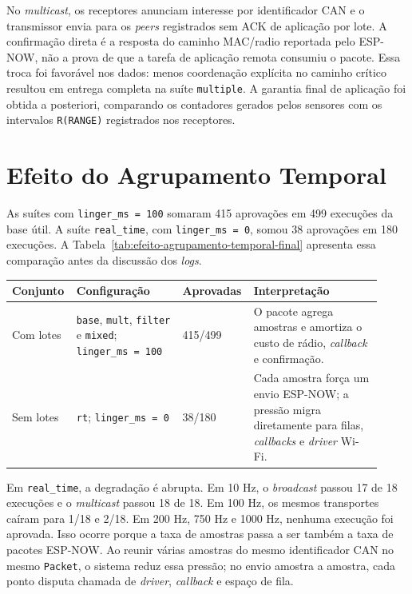 No \emph{multicast}, os receptores anunciam interesse por identificador CAN e o transmissor envia
para os \emph{peers} registrados sem ACK de aplicação por lote. A confirmação direta é
a resposta do caminho MAC/radio reportada pelo ESP-NOW, não a prova de que a
tarefa de aplicação remota consumiu o pacote. Essa troca foi favorável nos dados:
menos coordenação explícita no caminho crítico resultou em entrega completa na
suíte \texttt{multiple}. A garantia final de aplicação foi obtida a posteriori,
comparando os contadores gerados pelos sensores com os intervalos \texttt{R(RANGE)}
registrados nos receptores.

\section{Efeito do Agrupamento Temporal}

As suítes com \texttt{linger\_ms = 100} somaram 415 aprovações em 499 execuções
da base útil. A suíte \texttt{real\_time}, com \texttt{linger\_ms = 0}, somou
38 aprovações em 180 execuções. A Tabela~\ref{tab:efeito-agrupamento-temporal-final}
apresenta essa comparação antes da discussão dos \emph{logs}.

\begin{center}
\small
\setlength{\tabcolsep}{5pt}
\renewcommand{\arraystretch}{1.12}
\begin{tabular}{p{0.16\linewidth}|p{0.28\linewidth}|p{0.14\linewidth}|p{0.34\linewidth}}
\hline
Conjunto & Configuração & Aprovadas & Interpretação \\
\hline
Com lotes & \texttt{base}, \texttt{mult}, \texttt{filter} e \texttt{mixed}; \texttt{linger\_ms = 100} & 415/499 & O pacote agrega amostras e amortiza o custo de rádio, \emph{callback} e confirmação. \\
\hline
Sem lotes & \texttt{rt}; \texttt{linger\_ms = 0} & 38/180 & Cada amostra força um envio ESP-NOW; a pressão migra diretamente para filas, \emph{callbacks} e \emph{driver} Wi-Fi. \\
\hline
\end{tabular}
\label{tab:efeito-agrupamento-temporal-final}
\end{center}

Em \texttt{real\_time}, a degradação é abrupta. Em 10 Hz, o \emph{broadcast} passou 17
de 18 execuções e o \emph{multicast} passou 18 de 18. Em 100 Hz, os mesmos transportes
caíram para 1/18 e 2/18. Em 200 Hz, 750 Hz e 1000 Hz, nenhuma execução foi
aprovada. Isso ocorre porque a taxa de amostras passa a ser também a taxa de
pacotes ESP-NOW. Ao reunir várias amostras do mesmo identificador CAN no mesmo
\texttt{Packet}, o sistema reduz essa pressão; no envio amostra a amostra, cada ponto
disputa chamada de \emph{driver}, \emph{callback} e espaço de fila.

